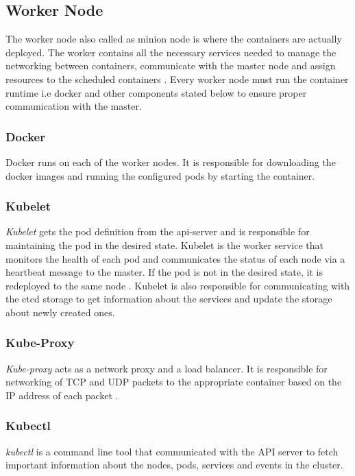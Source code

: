 \documentclass[9pt,twocolumn,twoside]{../../styles/osajnl}
\begin{document}
\subsection{Worker Node}
The worker node also called as minion node is where the containers are
actually deployed. The worker contains all the necessary services
needed to manage the networking between containers, communicate with
the master node and assign resources to the scheduled containers
\cite{www-kubernetes-architecture}.  Every worker node must run the
container runtime i.e docker and other components stated below to
ensure proper communication with the master.

\subsubsection{Docker}
Docker runs on each of the worker nodes. It is responsible for
downloading the docker images and running the configured pods by
starting the container.

\subsubsection{Kubelet}
\emph{Kubelet} gets the pod definition from the api-server and is
responsible for maintaining the pod in the desired state. Kubelet is
the worker service that monitors the health of each pod and
communicates the status of each node via a heartbeat message to the
master.  If the pod is not in the desired state, it is redeployed to
the same node \cite{www-wiki-kubernetes}. Kubelet is also responsible
for communicating with the etcd storage to get information about the
services and update the storage about newly created ones.

\subsubsection{Kube-Proxy}
\emph{Kube-proxy} acts as a network proxy and a load balancer. It is
responsible for networking of TCP and UDP packets to the appropriate
container based on the IP address of each packet
\cite{www-wiki-kubernetes} \cite{www-kubernetes-architecture}.

\subsubsection{Kubectl}
\emph{kubectl} is a command line tool that communicated with the API
server to fetch important information about the nodes, pods, services
and events in the cluster.
\end{document}
